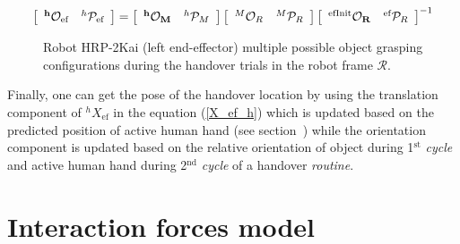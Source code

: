 \begin{gather}\label{X_efinit_hori}
\left[\begin{array}{cc}
\bf{{}^{h}\mathcal{O}_{\text{ef}}} & {}^{h}\mathcal{P}_{\text{ef}}
\end{array}\right] =
\left[\begin{array}{cc}
\bf{{}^{h}\mathcal{O}_M} & {}^{h}\mathcal{P}_M
\end{array}\right]
\left[\begin{array}{cc}
{}^{M}\mathcal{O}_R & {}^{M}\mathcal{P}_R
\end{array}\right]
\left[\begin{array}{cc}
\bf{{}^\text{efInit}\mathcal{O}_{R}} & {}^{\text{ef}}\mathcal{P}_{R}
\end{array}\right]^{-1}
\end{gather}


\begin{figure}[ht]
	\caption{Robot HRP-2Kai (left end-effector) multiple possible object grasping configurations during the handover trials in the robot frame $\mathcal{R}$.}
	\label{fig:robot_lt_orientations}
\end{figure} 

Finally, one can get the pose of the handover location by using the translation component of ${}^{h}{X}_{\text{ef}} $ in the equation (\ref{X_ef_h}) which is updated based on the predicted position of active human hand (see section~) while the orientation component is updated based on the relative orientation of object during 1$^\text{st}$ \textit{cycle} and active human hand during 2$^\text{nd}$ \textit{cycle} of a handover \textit{routine}.


\section{Interaction forces model}\label{interaction model}


